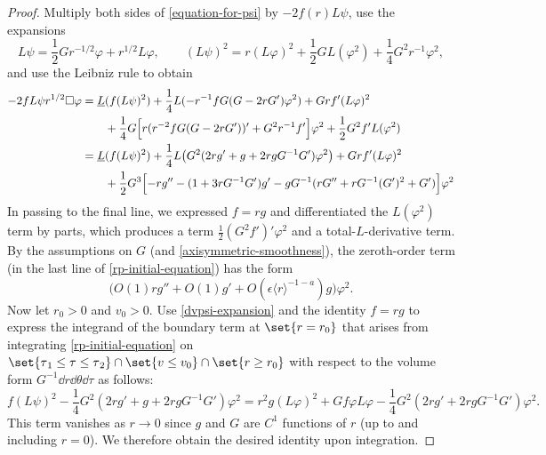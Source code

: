 \documentclass[10pt, reqno]{amsart}
\begin{document}
\begin{proof}
Multiply both sides of \cref{equation-for-psi} by \(-2f(r)L\psi{}\), use the expansions
\begin{equation}\label{dvpsi-expansion}
L\psi{} = \frac{1}{2}Gr^{-1/2}\varphi{} + r^{1/2}L\varphi{},\qquad (L\psi{})^2 = r(L\varphi{})^2 + \frac{1}{2}GL(\varphi{}^2) + \frac{1}{4}G^2r^{-1}\varphi^2,
\end{equation}
and use the Leibniz rule to obtain
\begin{equation}\label{rp-initial-equation}
\begin{split}
-2fL\psi{}r^{1/2}\Box{}\varphi{} &=  \underline{L}(f(L\psi{})^2) + \frac{1}{4}L(-r^{-1}fG(G - 2rG')\varphi^2) + Grf'(L\varphi{})^2 \\
&\qquad + \frac{1}{4}G\Bigl[r(r^{-2}fG(G - 2rG'))' + G^2r^{-1}f'\Bigr]\varphi^2 + \frac{1}{2}G^2f'L(\varphi^2) \\
&= \underline{L}(f(L\psi{})^2) + \frac{1}{4}L\bigl(G^2(2rg' + g  + 2rgG^{-1}G')\varphi^2\bigr) + Grf'(L\varphi{})^2 \\
&\qquad  + \frac{1}{2}G^3\Bigl[-rg'' - (1 + 3rG^{-1}G')g' - gG^{-1}(rG'' + rG^{-1}(G')^2 + G')\Bigr]\varphi{}^2
\end{split}
\end{equation}
In passing to the final line, we expressed \(f = rg\) and differentiated the
\(L(\varphi^2)\) term by parts, which produces a term \(\frac{1}{2}(G^2f')'\varphi^2\)
and a total-\(L\)-derivative term. By the assumptions on \(G\) (and
\cref{axisymmetric-smoothness}), the zeroth-order term (in the last line of
\cref{rp-initial-equation}) has the form
\begin{equation}
\bigl(O(1)rg'' + O(1)g' + O(\epsilon{}\langle{}r\rangle^{-1-a})g\bigr)\varphi^2.
\end{equation}
Now let \(r_0>0\) and \(v_0 > 0\). Use \cref{dvpsi-expansion} and the identity \(f
= rg\) to express the integrand of the boundary term at \(\set{r=r_0}\) that
arises from integrating \cref{rp-initial-equation} on \(\set{\tau{}_1\le \tau{}\le
\tau{}_2}\cap \set{v\le v_0}\cap \set{r\ge r_0}\) with respect to the volume
form \(G^{-1}\dd{}r\dd{}\theta{}\dd{}\tau{}\) as follows:
\begin{equation}
f(L\psi{})^2 - \frac{1}{4}G^2(2rg' + g  + 2rgG^{-1}G')\varphi^2 = r^2g(L\varphi{})^2 + Gf\varphi{}L\varphi{} - \frac{1}{4}G^2(2rg' + 2rgG^{-1}G')\varphi^2.
\end{equation}
This term vanishes as \(r\to 0\) since \(g\) and \(G\) are \(C^1\) functions of
\(r\) (up to and including \(r = 0\)). We therefore obtain the desired identity
upon integration.
\end{proof}
\end{document}
